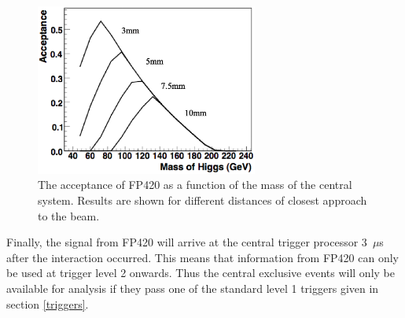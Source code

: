 \begin{figure} [t]
\centering
    	\includegraphics[width=0.65\textwidth]{Diagrams/peterbusseyacceptance.eps}
\caption[The acceptance of FP420 as a function of the mass of the central system]{The acceptance of FP420 \cite{Cox:2005tb} as a function of the mass of the central system. Results are shown for different distances of closest approach to the beam.\label{fp420accept}}
\end{figure}

Finally, the signal from FP420 will arrive at the central trigger processor 3~$\mu$s after the interaction occurred. This means that information from FP420  can only be used at trigger level 2 onwards. Thus the central exclusive events will only be available for analysis if they pass one of the standard level 1 triggers given in section \ref{triggers}.
